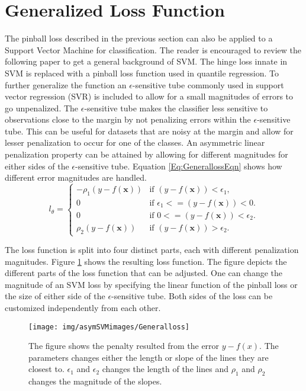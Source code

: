 \section{Generalized Loss Function}\label{generalform}
The pinball loss described in the previous section can also be applied to a Support Vector Machine for classification. The reader is encouraged to review the following paper \citep{Vapnik98} to get a general background of SVM. The hinge loss innate in SVM is replaced with a pinball loss function used in quantile regression. To further generalize the function an $\epsilon$-sensitive tube commonly used in support vector regression (SVR) is included to allow for a small magnitudes of errors to go unpenalized. The $\epsilon$-sensitive tube makes the classifier less sensitive to observations close to the margin by not penalizing errors within the $\epsilon$-sensitive tube. This can be useful for datasets that are noisy at the margin and allow for lesser penalization to occur for one of the classes. An asymmetric linear penalization property can be attained by allowing for different magnitudes for either sides of the $\epsilon$-sensitive tube. Equation \ref{Eq:GenerallossEqn} shows how different error magnitudes are handled.
\begin{equation}\label{Eq:GenerallossEqn}
l_{\theta}=\begin{cases} 
	-\rho_1(y-f(\mathbf{x})) & \text{if $(y-f(\mathbf{x}))< \epsilon_1$,} \\
 0  &\text{if $\epsilon_1<=(y-f(\mathbf{x}))< 0$.} \\
 0  &\text{if $0<=(y-f(\mathbf{x}))< \epsilon_2$.} \\
 \rho_2(y-f(\mathbf{x})) &\text{if $(y-f(\mathbf{x}))>\epsilon_2$.}
\end{cases}
\end{equation}

The loss function is split into four distinct parts, each with different penalization magnitudes. Figure \ref{Fig:General Loss} shows the resulting loss function. The figure depicts the different parts of the loss function that can be adjusted. One can change the magnitude of an SVM loss by specifying the linear function of the pinball loss or the size of either side of the $\epsilon$-sensitive tube. Both sides of the loss can be customized independently from each other.
\begin{figure}
 \centering
\texttt{[image: img/asymSVMimages/Generalloss]}\\
 \caption{The figure shows the penalty resulted from the error $y-f(x)$. The parameters changes either the length or slope of the lines they are closest to. $\epsilon_1$ and $\epsilon_2$ changes the length of the lines and $\rho_1$ and $\rho_2$ changes the magnitude of the slopes.}
 \label{Fig:General Loss}
\end{figure}



